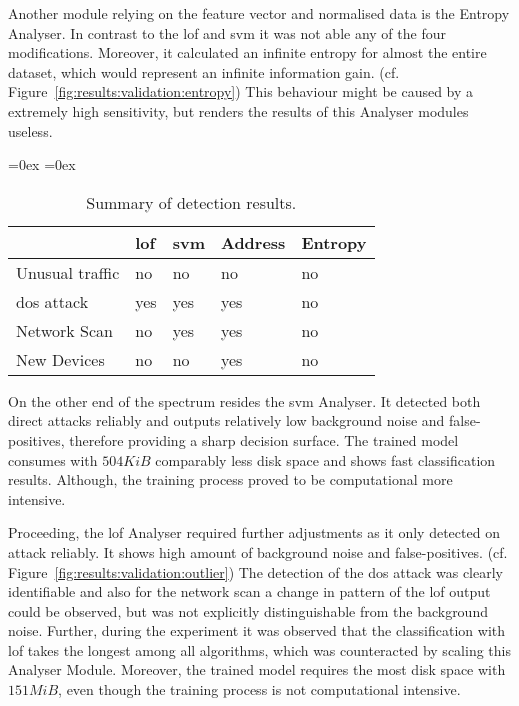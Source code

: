 Another module relying on the feature vector and normalised data is the Entropy Analyser.
In contrast to the \gls{lof} and \gls{svm} it was not able any of the four modifications. Moreover, it calculated an infinite entropy for almost the entire dataset, which would represent an infinite information gain. (cf. Figure~\ref{fig:results:validation:entropy})
This behaviour might be caused by a extremely high sensitivity, but renders the results of this Analyser modules useless.

\begin{table}[h]
	\aboverulesep=0ex
	\belowrulesep=0ex
	\renewcommand{\arraystretch}{1.2}
	
	\centering
	\begin{tabularx}{0.95\textwidth}{|l|Y|Y|Y|Y|}
		\toprule
		& \gls{lof} & \gls{svm} & Address & Entropy \\\midrule
		Unusual traffic & no & no & no & no \\\midrule
		\gls{dos} attack & yes & yes & yes & no \\\midrule
		Network Scan & no & yes & yes & no \\\midrule
		New Devices & no & no & yes & no \\\midrule
	\end{tabularx}
	\caption[Summary of detection results]{Summary of detection results.}
	\label{tab:results:conclusion}
\end{table}

On the other end of the spectrum resides the \gls{svm} Analyser. It detected both direct attacks reliably and outputs relatively low background noise and false-positives, therefore providing a sharp decision surface.
The trained model consumes with $504 KiB$ comparably less disk space and shows fast classification results. Although, the training process proved to be computational more intensive.

Proceeding, the \gls{lof} Analyser required further adjustments as it only detected on attack reliably.
It shows high amount of background noise and false-positives. (cf. Figure~\ref{fig:results:validation:outlier}) The detection of the \gls{dos} attack was clearly identifiable and also for the network scan a change in pattern of the \gls{lof} output could be observed, but was not explicitly distinguishable from the background noise.
Further, during the experiment it was observed that the classification with \gls{lof} takes the longest among all algorithms, which was counteracted by scaling this Analyser Module.
Moreover, the trained model requires the most disk space with $151 MiB$, even though the training process is not computational intensive.

